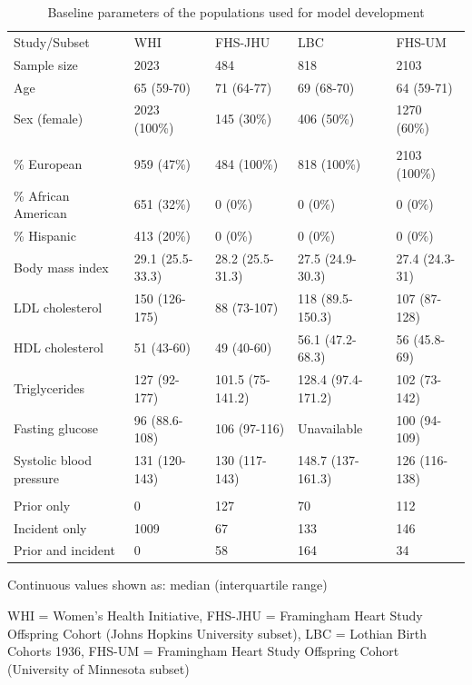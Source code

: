 \documentclass[]{article}
\begin{document}
\begin{table}[t]

\caption{\label{tab:pop-description}Baseline parameters of the populations used for model development}
\centering
\begin{threeparttable}
\begin{tabular}{lllll}
\toprule
Study/Subset & WHI & FHS-JHU & LBC & FHS-UM\\
Sample size & 2023 & 484 & 818 & 2103\\
Age & 65 (59-70) & 71 (64-77) & 69 (68-70) & 64 (59-71)\\
Sex (female) & 2023 (100\%) & 145 (30\%) & 406 (50\%) & 1270 (60\%)\\
\addlinespace[0em]
\multicolumn{5}{l}{Ancestry}\\
\hspace{1em}\% European & 959 (47\%) & 484 (100\%) & 818 (100\%) & 2103 (100\%)\\
\hspace{1em}\% African American & 651 (32\%) & 0 (0\%) & 0 (0\%) & 0 (0\%)\\
\hspace{1em}\% Hispanic & 413 (20\%) & 0 (0\%) & 0 (0\%) & 0 (0\%)\\
Body mass index & 29.1 (25.5-33.3) & 28.2 (25.5-31.3) & 27.5 (24.9-30.3) & 27.4 (24.3-31)\\
LDL cholesterol & 150 (126-175) & 88 (73-107) & 118 (89.5-150.3) & 107 (87-128)\\
HDL cholesterol & 51 (43-60) & 49 (40-60) & 56.1 (47.2-68.3) & 56 (45.8-69)\\
Triglycerides & 127 (92-177) & 101.5 (75-141.2) & 128.4 (97.4-171.2) & 102 (73-142)\\
Fasting glucose & 96 (88.6-108) & 106 (97-116) & Unavailable & 100 (94-109)\\
Systolic blood pressure & 131 (120-143) & 130 (117-143) & 148.7 (137-161.3) & 126 (116-138)\\
\addlinespace[0em]
\multicolumn{5}{l}{\# CVD events}\\
\hspace{1em}Prior only & 0 & 127 & 70 & 112\\
\hspace{1em}Incident only & 1009 & 67 & 133 & 146\\
\hspace{1em}Prior and incident & 0 & 58 & 164 & 34\\
\bottomrule
\end{tabular}
\begin{tablenotes}
\item * Continuous values shown as: median (interquartile range)
\item WHI = Women's Health Initiative, FHS-JHU = Framingham Heart Study Offspring Cohort (Johns Hopkins University subset), LBC = Lothian Birth Cohorts 1936, FHS-UM = Framingham Heart Study Offspring Cohort (University of Minnesota subset)
\end{tablenotes}
\end{threeparttable}
\end{table}
\end{document}

